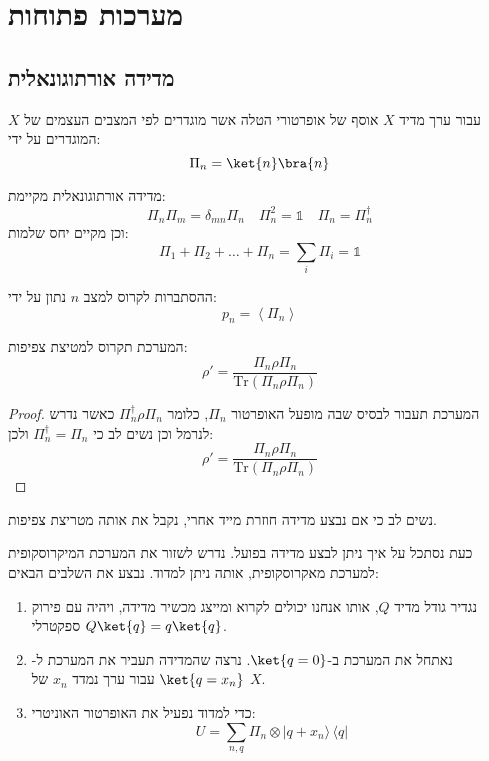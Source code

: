 \documentclass{tstextbook}
\begin{document}
\section{מערכות פתוחות}

\subsection{מדידה אורתוגונאלית}

\begin{definition}
עבור ערך מדיד \(X\) אוסף של אופרטורי הטלה אשר מוגדרים לפי המצבים העצמים של \(X\) המוגדרים על ידי:
$$\Pi_{n}=\ket{n} \bra{n} $$

\end{definition}
\begin{proposition}
מדידה אורתוגונאלית מקיימת:
$$\Pi_{n}\Pi_{m}=\delta_{mn}\Pi_{n}\quad \Pi_{n}^{2}=\mathbb{1} \quad \Pi_{n}=\Pi_{n}^{\dagger}$$
וכן מקיים יחס שלמות:
$$\Pi_{1}+\Pi_{2}+\dots+\Pi_{n}=\sum_{i}\Pi_{i}=\mathbb{1} $$

\end{proposition}
\begin{proposition}
ההסתברות לקרוס למצב \(n\) נתון על ידי:
$$p_{n}=\left\langle  \Pi_{n}  \right\rangle $$

\end{proposition}
\begin{proposition}
המערכת תקרוס למטיצת צפיפות:
$$\rho'= \frac{\Pi_{n}\rho \Pi_{n}}{\mathrm{Tr}\left( \Pi_{n}\rho \Pi_{n} \right)}$$

\end{proposition}
\begin{proof}
המערכת תעבור לבסיס שבה מופעל האופרטור \(\Pi_{n}\), כלומר \(\Pi_{n}^{\dagger}\rho \Pi_{n}\) כאשר נדרש לנרמל וכן נשים לב כי \(\Pi ^{\dagger}_{n}=\Pi_{n}\) ולכן:
$$\rho'= \frac{\Pi_{n}\rho \Pi_{n}}{\mathrm{Tr}\left( \Pi_{n}\rho \Pi_{n} \right)}$$

\end{proof}
\begin{remark}
נשים לב כי אם נבצע מדידה חוזרת מייד אחרי, נקבל את אותה מטריצת צפיפות.

\end{remark}
\begin{proposition}
כעת נסתכל על איך ניתן לבצע מדידה בפועל. נדרש לשזור את המערכת המיקרוסקופית למערכת מאקרוסקופית, אותה ניתן למדוד. נבצע את השלבים הבאים:

  \begin{enumerate}
    \item נגדיר גודל מדיד \(Q\), אותו אנחנו יכולים לקרוא ומייצג מכשיר מדידה, ויהיה עם פירוק ספקטרלי \(Q\ket{q}=q\ket{q}\). 


    \item נאתחל את המערכת ב-\(\ket{q=0}\). נרצה שהמדידה תעביר את המערכת ל-\(\ket{q=x_{n}}\) עבור ערך נמדד \(x_{n}\) של \(X\). 


    \item כדי למדוד נפעיל את האופרטור האוניטרי: 
$$U=\sum_{n,q}\Pi_{n}\otimes|q+x_{n}\rangle\,\langle q|$$


  \end{enumerate}
\end{proposition}
\end{document}
